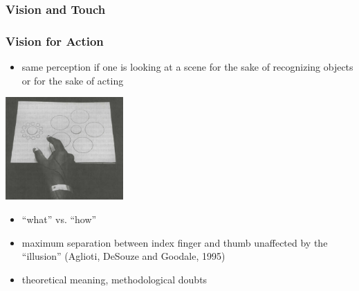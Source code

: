 \documentclass[]{beamer}
\begin{document}
\begin{frame}
 \frametitle{Vision and Touch}
\end{frame}


\begin{frame}
 \frametitle{Vision for Action}
\begin{overlayarea}{120mm}{90mm}
 \begin{itemize}
 \item same perception if one is looking at a scene for the sake of recognizing objects or for the sake of acting
 \end{itemize}

\begin{center}
\includegraphics[width=45mm]{figs/l9/reaching_ebbinghaus.png}
\end{center}
\begin{itemize}
 \item<2-> ``what'' vs. ``how''
 \item<2-> maximum separation between index finger and thumb unaffected by the ``illusion'' (Aglioti, DeSouze and Goodale, 1995)
 \item<3-> theoretical meaning, methodological doubts
\end{itemize}

\end{overlayarea}
\end{frame}
\end{document}

